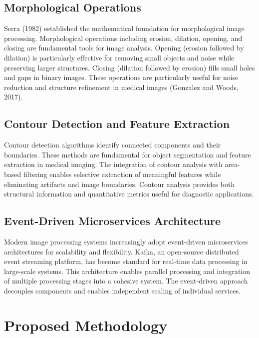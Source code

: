 \documentclass[12pt,a4paper]{article}
\begin{document}
\subsection{Morphological Operations}

Serra (1982) established the mathematical foundation for morphological image processing. Morphological operations including erosion, dilation, opening, and closing are fundamental tools for image analysis. Opening (erosion followed by dilation) is particularly effective for removing small objects and noise while preserving larger structures. Closing (dilation followed by erosion) fills small holes and gaps in binary images. These operations are particularly useful for noise reduction and structure refinement in medical images (Gonzalez and Woods, 2017).

\subsection{Contour Detection and Feature Extraction}

Contour detection algorithms identify connected components and their boundaries. These methods are fundamental for object segmentation and feature extraction in medical imaging. The integration of contour analysis with area-based filtering enables selective extraction of meaningful features while eliminating artifacts and image boundaries. Contour analysis provides both structural information and quantitative metrics useful for diagnostic applications.

\subsection{Event-Driven Microservices Architecture}

Modern image processing systems increasingly adopt event-driven microservices architectures for scalability and flexibility. Kafka, an open-source distributed event streaming platform, has become standard for real-time data processing in large-scale systems. This architecture enables parallel processing and integration of multiple processing stages into a cohesive system. The event-driven approach decouples components and enables independent scaling of individual services.

\newpage

\section{Proposed Methodology}
\end{document}
